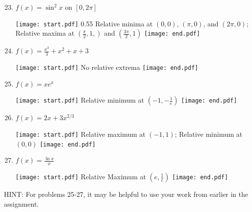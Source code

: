 \documentclass[12pt]{article}
\begin{document}

\begin{enumerate}
\setcounter{enumi}{22}

\item $f(x) = \sin^{2}{x} \text{ on } [0,2\pi]$ 

\texttt{[image: start.pdf]}
{{{0.55\linewidth}{
Relative minima at $(0,0)$, $(\pi,0)$, and $(2\pi,0)$;\\
Relative maxima at $\left(\frac{\pi}{2},1,\right)$ and $\left(\frac{3\pi}{2},1\right)$}}}
\texttt{[image: end.pdf]}


\item $f(x)=\frac{x^3}{3}+x^2+x+3$

\texttt{[image: start.pdf]}
{{No relative extrema}}
\texttt{[image: end.pdf]}


\item $f(x) = xe^x$  

\texttt{[image: start.pdf]}
{{Relative minimum at $\left(-1,-\frac{1}{e}\right)$}}
\texttt{[image: end.pdf]}


\item $f(x)=2x+3x^{2/3}$

\texttt{[image: start.pdf]}
{{Relative maximum at $(-1,1)$; Relative minimum at $(0,0)$}}
\texttt{[image: end.pdf]}


\item $f(x)=\frac{\ln{x}}{x}$

\texttt{[image: start.pdf]}
{{Relative Maximum at $\left(e,\frac{1}{e}\right)$}}
\texttt{[image: end.pdf]}


\end{enumerate}

\noindent HINT: For problems 25-27, it may be helpful to use your work from earlier in the assignment.
\end{document}
